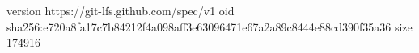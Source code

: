 version https://git-lfs.github.com/spec/v1
oid sha256:e720a8fa17c7b84212f4a098aff3e63096471e67a2a89c8444e88cd390f35a36
size 174916
